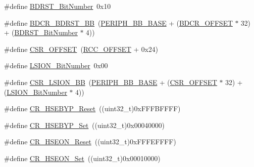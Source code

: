 \begin{DoxyCompactItemize}
\item 
\#define \mbox{\hyperlink{group___r_c_c___private___defines_gae6718158034388d8fde8caaa28ffe8b9}{B\+D\+R\+S\+T\+\_\+\+Bit\+Number}}~0x10
\item 
\#define \mbox{\hyperlink{group___r_c_c___private___defines_ga892fdf297b85b85cbaf0723649b31818}{B\+D\+C\+R\+\_\+\+B\+D\+R\+S\+T\+\_\+\+BB}}~(\mbox{\hyperlink{group___peripheral__memory__map_gaed7efc100877000845c236ccdc9e144a}{P\+E\+R\+I\+P\+H\+\_\+\+B\+B\+\_\+\+B\+A\+SE}} + (\mbox{\hyperlink{group___r_c_c___private___defines_ga5f8a0c3cb5f5c835bf7eef09515138ad}{B\+D\+C\+R\+\_\+\+O\+F\+F\+S\+ET}} $\ast$ 32) + (\mbox{\hyperlink{group___r_c_c___private___defines_gae6718158034388d8fde8caaa28ffe8b9}{B\+D\+R\+S\+T\+\_\+\+Bit\+Number}} $\ast$ 4))
\item 
\#define \mbox{\hyperlink{group___r_c_c___private___defines_ga984cbe73312b6d3d355c5053763d499a}{C\+S\+R\+\_\+\+O\+F\+F\+S\+ET}}~(\mbox{\hyperlink{group___r_c_c___private___defines_ga539e07c3b3c55f1f1d47231341fb11e1}{R\+C\+C\+\_\+\+O\+F\+F\+S\+ET}} + 0x24)
\item 
\#define \mbox{\hyperlink{group___r_c_c___private___defines_ga3f9dbe50769ce2a63ae12520433b9b40}{L\+S\+I\+O\+N\+\_\+\+Bit\+Number}}~0x00
\item 
\#define \mbox{\hyperlink{group___r_c_c___private___defines_gaa253e36e7e5fb02998c0e4d0388abc52}{C\+S\+R\+\_\+\+L\+S\+I\+O\+N\+\_\+\+BB}}~(\mbox{\hyperlink{group___peripheral__memory__map_gaed7efc100877000845c236ccdc9e144a}{P\+E\+R\+I\+P\+H\+\_\+\+B\+B\+\_\+\+B\+A\+SE}} + (\mbox{\hyperlink{group___r_c_c___private___defines_ga984cbe73312b6d3d355c5053763d499a}{C\+S\+R\+\_\+\+O\+F\+F\+S\+ET}} $\ast$ 32) + (\mbox{\hyperlink{group___r_c_c___private___defines_ga3f9dbe50769ce2a63ae12520433b9b40}{L\+S\+I\+O\+N\+\_\+\+Bit\+Number}} $\ast$ 4))
\item 
\#define \mbox{\hyperlink{group___r_c_c___private___defines_ga98f5ef520febdb0a1cd8f407f8e5e62f}{C\+R\+\_\+\+H\+S\+E\+B\+Y\+P\+\_\+\+Reset}}~((uint32\+\_\+t)0x\+F\+F\+F\+B\+F\+F\+F\+F)
\item 
\#define \mbox{\hyperlink{group___r_c_c___private___defines_ga84972845ff646ce1d3902d54dd7b9bc6}{C\+R\+\_\+\+H\+S\+E\+B\+Y\+P\+\_\+\+Set}}~((uint32\+\_\+t)0x00040000)
\item 
\#define \mbox{\hyperlink{group___r_c_c___private___defines_ga8185e6ea6e9abafcdee0e5f58e62805e}{C\+R\+\_\+\+H\+S\+E\+O\+N\+\_\+\+Reset}}~((uint32\+\_\+t)0x\+F\+F\+F\+E\+F\+F\+F\+F)
\item 
\#define \mbox{\hyperlink{group___r_c_c___private___defines_gaca6ef9e2f11b921355809a5eccfec864}{C\+R\+\_\+\+H\+S\+E\+O\+N\+\_\+\+Set}}~((uint32\+\_\+t)0x00010000)

\end{DoxyCompactItemize}
